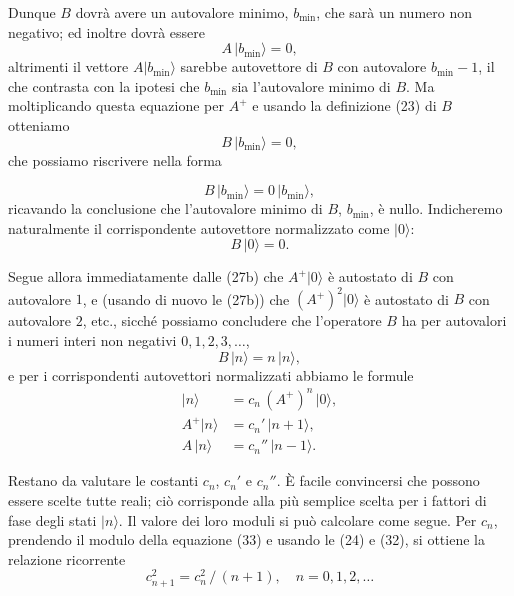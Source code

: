 \documentclass[11pt, a4paper]{book}
\numberwithin{equation}{section}
\begin{document}
Dunque $B$ dovrà avere un autovalore minimo, $b_{\min}$, che sarà un
numero non negativo; ed inoltre dovrà essere
\begin{equation}
A\,|b_{\min}\rangle = 0,
\end{equation}
altrimenti il vettore $A|b_{\min}\rangle$ sarebbe autovettore di $B$ con
autovalore $b_{\min}-1$, il che contrasta con la ipotesi che $b_{\min}$
sia l'autovalore minimo di $B$. Ma moltiplicando questa equazione per $A^+$
e usando la definizione (23) di $B$ otteniamo
\begin{equation}
B\,|b_{\min}\rangle = 0, \tag{30a}
\end{equation}
che possiamo riscrivere nella forma


\begin{equation}
B\,|b_{\min}\rangle = 0\,|b_{\min}\rangle, \tag{30b}
\end{equation}
ricavando la conclusione che l'autovalore minimo di $B$, $b_{\min}$, è
nullo. Indicheremo naturalmente il corrispondente autovettore normalizzato
come $|0\rangle$:
\begin{equation}
B\,|0\rangle = 0.
\end{equation}

Segue allora immediatamente dalle (27b) che $A^+|0\rangle$ è autostato di
$B$ con autovalore $1$, e (usando di nuovo le (27b)) che $(A^+)^2|0\rangle$
è autostato di $B$ con autovalore $2$, etc., sicché possiamo concludere
che l'operatore $B$ ha per autovalori i numeri interi non negativi
$0, 1, 2, 3, \ldots$,
\begin{equation}
B\,|n\rangle = n\,|n\rangle,
\end{equation}
e per i corrispondenti autovettori normalizzati abbiamo le formule
\begin{align}
|n\rangle       &= c_n\,(A^+)^n\,|0\rangle,   \tag{33} \\
A^+|n\rangle    &= c_n'\,|n+1\rangle,          \tag{34a} \\
A\,|n\rangle    &= c_n''\,|n-1\rangle.         \tag{34b}
\end{align}

Restano da valutare le costanti $c_n$, $c_n'$ e $c_n''$. È facile
convincersi che possono essere scelte tutte reali; ciò corrisponde alla
più semplice scelta per i fattori di fase degli stati $|n\rangle$. Il
valore dei loro moduli si può calcolare come segue. Per $c_n$, prendendo
il modulo della equazione (33) e usando le (24) e (32), si ottiene la
relazione ricorrente
\begin{equation}
c_{n+1}^2 = c_n^2\,/\,(n+1), \quad n = 0, 1, 2, \ldots
\end{equation}
\end{document}
